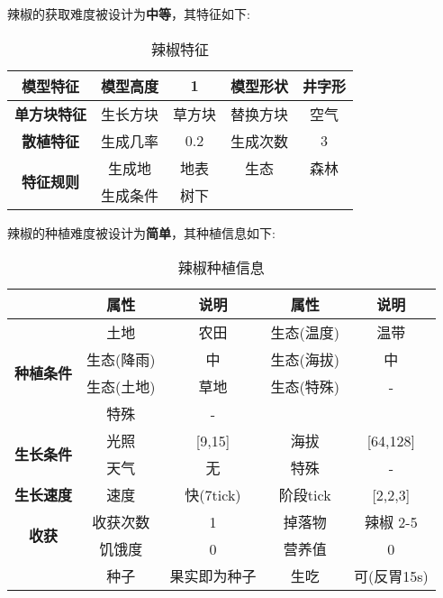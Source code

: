 辣椒的获取难度被设计为\textbf{中等}，其特征如下:
\begin{table}[H]
    \centering
    \caption{辣椒特征}
    \label{table:辣椒特征}
    \setlength{\tabcolsep}{4mm}
    \begin{tabular}{c|cc|cc}
        \toprule
        \textbf{模型特征}                  & 模型高度 & 1      & 模型形状 & 井字形 \\
        \midrule
        \textbf{单方块特征}                & 生长方块 & 草方块 & 替换方块 & 空气   \\
        \midrule
        \textbf{散植特征}                  & 生成几率 & 0.2    & 生成次数 & 3      \\
        \midrule
        \multirow{2}{*}{\textbf{特征规则}} & 生成地   & 地表   & 生态     & 森林   \\
                                           & 生成条件 & 树下                       \\
        \bottomrule
    \end{tabular}
\end{table}


辣椒的种植难度被设计为\textbf{简单}，其种植信息如下:

\begin{table}[H]
    \centering
    \caption{辣椒种植信息}
    \label{table:辣椒种植信息}
    \setlength{\tabcolsep}{4mm}
    \begin{tabular}{c|cc|cc}
        \toprule
                                           & \textbf{属性} & \textbf{说明} & \textbf{属性} & \textbf{说明} \\
        \midrule
        \multirow{4}{*}{\textbf{种植条件}} & 土地          & 农田          & 生态(温度)    & 温带          \\
                                           & 生态(降雨)    & 中            & 生态(海拔)    & 中            \\
                                           & 生态(土地)    & 草地          & 生态(特殊)    & -             \\
                                           & 特殊          & -                                             \\
        \midrule
        \multirow{2}{*}{\textbf{生长条件}} & 光照          & [9,15]        & 海拔          & [64,128]      \\
                                           & 天气          & 无            & 特殊          & -             \\
        \midrule
        \textbf{生长速度}                  & 速度          & 快(7tick)     & 阶段tick      & [2,2,3]       \\
        \midrule
        \multirow{2}{*}{\textbf{收获}}     & 收获次数      & 1             & 掉落物        & 辣椒 2-5      \\
                                           & 饥饿度        & 0             & 营养值        & 0             \\
                                           & 种子          & 果实即为种子  & 生吃          & 可(反胃15s)   \\
        \bottomrule
    \end{tabular}
\end{table}

